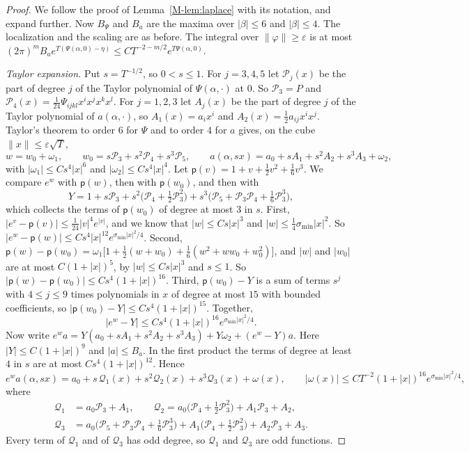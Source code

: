 \documentclass[EJP,preprint]{ejpecp}
\newcommand{\mref}[1]{\ref*{M-#1}}
\begin{document}
\begin{proof}
We follow the proof of Lemma~\mref{lem:laplace} with its notation, and expand
further. Now $B_\Psi$ and $B_a$ are the maxima over $|\beta|\le6$ and
$|\beta|\le4$. The localization and the scaling are as before. The integral
over $\lVert\varphi\rVert\ge\varepsilon$ is at most
$(2\pi)^mB_ae^{T(\Psi(\alpha,0)-\eta)}\le CT^{-2-m/2}e^{T\Psi(\alpha,0)}$.

\emph{Taylor expansion.} Put $s=T^{-1/2}$, so $0<s\le1$. For $j=3,4,5$ let
$\mathcal P_j(x)$ be the part of degree $j$ of the Taylor polynomial of
$\Psi(\alpha,\cdot)$ at $0$. So $\mathcal P_3=P$ and
$\mathcal P_4(x)=\frac1{24}\Psi_{ijkl}x^ix^jx^kx^l$. For $j=1,2,3$ let $A_j(x)$ be the
part of degree $j$ of the Taylor polynomial of $a(\alpha,\cdot)$, so
$A_1(x)=a_ix^i$ and $A_2(x)=\frac12a_{ij}x^ix^j$. Taylor's theorem to order
$6$ for $\Psi$ and to order $4$ for $a$ gives, on the cube
$\lVert x\rVert\le\varepsilon\sqrt T$,
\[
w=w_0+\omega_1,\qquad w_0=s\mathcal P_3+s^2\mathcal P_4+s^3\mathcal P_5,\qquad
a(\alpha,sx)=a_0+sA_1+s^2A_2+s^3A_3+\omega_2,
\]
with $|\omega_1|\le Cs^4|x|^6$ and $|\omega_2|\le Cs^4|x|^4$. Let
$\mathsf p(v)=1+v+\frac12v^2+\frac16v^3$. We compare $e^w$ with
$\mathsf p(w)$, then with $\mathsf p(w_0)$, and then with
\[
Y=1+s\mathcal P_3+s^2\bigl(\mathcal P_4+\tfrac12\mathcal P_3^2\bigr)
+s^3\bigl(\mathcal P_5+\mathcal P_3\mathcal P_4+\tfrac16\mathcal P_3^3\bigr),
\]
which collects the terms of $\mathsf p(w_0)$ of degree at most $3$ in $s$.
First, $|e^v-\mathsf p(v)|\le\frac1{24}|v|^4e^{|v|}$, and we know that
$|w|\le Cs|x|^3$ and $|w|\le\frac14\sigma_{\min}|x|^2$. So
$|e^w-\mathsf p(w)|\le Cs^4|x|^{12}e^{\sigma_{\min}|x|^2/4}$. Second,
$\mathsf p(w)-\mathsf p(w_0)
=\omega_1\bigl[1+\frac12(w+w_0)+\frac16(w^2+ww_0+w_0^2)\bigr]$, and $|w|$ and
$|w_0|$ are at most $C(1+|x|)^5$, by $|w|\le Cs|x|^3$ and $s\le1$. So
$|\mathsf p(w)-\mathsf p(w_0)|\le Cs^4(1+|x|)^{16}$. Third,
$\mathsf p(w_0)-Y$ is a sum of terms $s^j$ with $4\le j\le9$ times
polynomials in $x$ of degree at most $15$ with bounded coefficients, so
$|\mathsf p(w_0)-Y|\le Cs^4(1+|x|)^{15}$. Together,
\[
|e^w-Y|\le Cs^4(1+|x|)^{16}e^{\sigma_{\min}|x|^2/4}.
\]
Now write $e^wa=Y(a_0+sA_1+s^2A_2+s^3A_3)+Y\omega_2+(e^w-Y)a$. Here
$|Y|\le C(1+|x|)^9$ and $|a|\le B_a$. In the first product the terms of
degree at least $4$ in $s$ are at most $Cs^4(1+|x|)^{12}$. Hence
\[
e^{w}a(\alpha,sx)=a_0+s\,\mathcal Q_1(x)+s^2\mathcal Q_2(x)+s^3\mathcal Q_3(x)
+\omega(x),\qquad
|\omega(x)|\le CT^{-2}(1+|x|)^{16}e^{\sigma_{\min}|x|^2/4},
\]
where
\begin{align*}
\mathcal Q_1&=a_0\mathcal P_3+A_1,\qquad
\mathcal Q_2=a_0\bigl(\mathcal P_4+\tfrac12\mathcal P_3^2\bigr)+A_1\mathcal P_3+A_2,\\
\mathcal Q_3&=a_0\bigl(\mathcal P_5+\mathcal P_3\mathcal P_4+\tfrac16\mathcal P_3^3\bigr)
+A_1\bigl(\mathcal P_4+\tfrac12\mathcal P_3^2\bigr)+A_2\mathcal P_3+A_3 .
\end{align*}
Every term of $\mathcal Q_1$ and of $\mathcal Q_3$ has odd degree, so
$\mathcal Q_1$ and $\mathcal Q_3$ are odd functions.


\end{proof}
\end{document}

